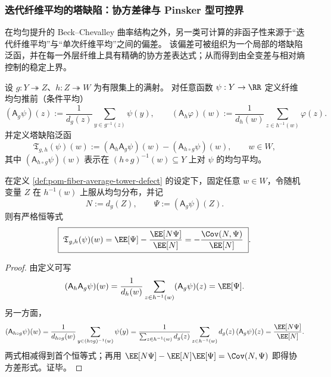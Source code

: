 \subsubsection{迭代纤维平均的塔缺陷：协方差律与 Pinsker 型可控界}\label{subsubsec:pom-tower-defect-covariance-pinsker}
在均匀提升的 Beck--Chevalley 曲率结构之外，另一类可计算的非函子性来源于“迭代纤维平均”与“单次纤维平均”之间的偏差。
该偏差可被组织为一个局部的塔缺陷泛函，并在每一外层纤维上具有精确的协方差表达式；从而得到由全变差与相对熵控制的稳定上界。

\begin{definition}[纤维均匀推前与塔缺陷]\label{def:pom-fiber-average-tower-defect}
设 \(g:Y\twoheadrightarrow Z\)、\(h:Z\twoheadrightarrow W\) 为有限集上的满射。
对任意函数 \(\psi:Y\to\RR\) 定义纤维均匀推前（条件平均）
\[
(\mathsf A_g\psi)(z):=\frac{1}{d_g(z)}\sum_{y\in g^{-1}(z)}\psi(y),
\qquad
(\mathsf A_h\varphi)(w):=\frac{1}{d_h(w)}\sum_{z\in h^{-1}(w)}\varphi(z).
\]
并定义塔缺陷泛函
\[
\mathfrak T_{g,h}(\psi)(w):=(\mathsf A_h\mathsf A_g\psi)(w)-(\mathsf A_{h\circ g}\psi)(w),
\qquad w\in W,
\]
其中 \((\mathsf A_{h\circ g}\psi)(w)\) 表示在 \((h\circ g)^{-1}(w)\subseteq Y\) 上对 \(\psi\) 的均匀平均。
\end{definition}

\begin{theorem}[塔缺陷的协方差表达式]\label{thm:pom-tower-defect-covariance-law}
在定义 \ref{def:pom-fiber-average-tower-defect} 的设定下，固定任意 \(w\in W\)，令随机变量 \(Z\) 在 \(h^{-1}(w)\) 上服从均匀分布，并记
\[
N:=d_g(Z),
\qquad
\Psi:=(\mathsf A_g\psi)(Z).
\]
则有严格恒等式
\[
\boxed{\;
\mathfrak T_{g,h}(\psi)(w)=\EE[\Psi]-\frac{\EE[N\Psi]}{\EE[N]}
=-\frac{\Cov(N,\Psi)}{\EE[N]}\; } .
\]
\end{theorem}
\begin{proof}
由定义可写
\[
(\mathsf A_h\mathsf A_g\psi)(w)=\frac{1}{d_h(w)}\sum_{z\in h^{-1}(w)}(\mathsf A_g\psi)(z)=\EE[\Psi].
\]
另一方面，
\[
(\mathsf A_{h\circ g}\psi)(w)
=\frac{1}{d_{h\circ g}(w)}\sum_{y\in (h\circ g)^{-1}(w)}\psi(y)
=\frac{1}{\sum_{z\in h^{-1}(w)}d_g(z)}\sum_{z\in h^{-1}(w)}d_g(z)\,(\mathsf A_g\psi)(z)
=\frac{\EE[N\Psi]}{\EE[N]}.
\]
两式相减得到首个恒等式；再用
\(
\EE[N\Psi]-\EE[N]\EE[\Psi]=\Cov(N,\Psi)
\)
即得协方差形式。证毕。
\end{proof}

